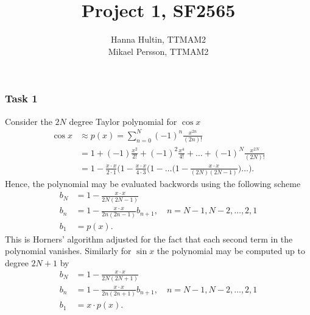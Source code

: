 \documentclass[a4paper,10pt]{article}
\title{Project 1, SF2565}
\author{Hanna Hultin, TTMAM2 \\ Mikael Persson, TTMAM2}
\begin{document}
\maketitle

\subsubsection*{Task 1}
Consider the $2N$ degree Taylor polynomial for  $\cos x$
\begin{align*}
  \cos x &\approx p(x) = \sum_{n=0}^{N} (-1)^n \frac{x^{2n}}{(2n)!} \\ 
  \quad &= 1 + (-1) \frac{x^2}{2!} + (-1)^2 \frac{x^4}{4!} + \dots + (-1)^N \frac{x^{2N}}{(2N)!}
  \\
  &= 1 - \frac{x\cdot x}{2\cdot 1} \Big(1 - \frac{x \cdot x}{ 4 \cdot 3} \Big( 
  1 - \dots \Big(1- \frac{x \cdot x}{(2N)(2N-1)}\Big)\dots \Big).
\end{align*}
Hence, the polynomial may be evaluated backwords using the following scheme
\begin{align*}
  b_N &= 1-\frac{x \cdot x}{2N(2N-1)} \\
  b_n &= 1-\frac{x\cdot x}{2n(2n-1)}b_{n+1},\quad n = N-1,N-2,\dots,2,1 \\
  b_1 &= p(x).
\end{align*}
This is Horners' algorithm adjusted for the fact that each second term in the polynomial vanishes.
Similarly for $\sin x$ the polynomial may be computed up to degree $2N+1$ by
\begin{align*}
  b_N &= 1-\frac{x \cdot x}{2N(2N+1)} \\
  b_n &= 1-\frac{x\cdot x}{2n(2n+1)}b_{n+1},\quad n = N-1,N-2,\dots,2,1 \\
  b_1 &= x \cdot p(x).
\end{align*}
\end{document}

